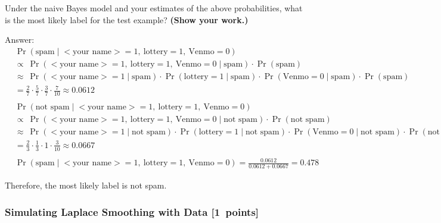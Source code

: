 \documentclass{article}
\newcommand{\blu}[1]{{\textcolor{blu}{#1}}}
\newenvironment{answer}{\par\begingroup\color{gre}Answer: }{\endgroup}
\let\ask\blu
\newcommand\pts[1]{\textcolor{pointscolour}{[#1~points]}}
\begin{document}
    \ask{Under the naive Bayes model and your estimates of the above probabilities, what is the most likely label for the test example? \textbf{(Show your work.)}}
    \begin{answer}
        \begin{align*}
            &\Pr(\text{spam} \mid \text{$<$your name$>$} = 1,\: \text{lottery} = 1,\: \text{Venmo} = 0)\\
            &\propto\: \Pr(\text{$<$your name$>$} = 1,\: \text{lottery} = 1,\: \text{Venmo} = 0\mid \text{spam}) \cdot \Pr(\text{spam})\\
            &\approx\: \Pr(\text{$<$your name$>$} = 1 \mid \text{spam}) \cdot \Pr(\text{lottery} = 1 \mid \text{spam}) \cdot \Pr(\text{Venmo} = 0\mid \text{spam}) \cdot \Pr(\text{spam})\\
            &= \frac{2}{7} \cdot \frac{5}{7} \cdot \frac{3}{7} \cdot \frac{7}{10} \approx 0.0612
            \\\\
            &\Pr(\text{not spam} \mid \text{$<$your name$>$} = 1,\: \text{lottery} = 1,\: \text{Venmo} = 0)\\
            &\propto\: \Pr(\text{$<$your name$>$} = 1,\: \text{lottery} = 1,\: \text{Venmo} = 0\mid \text{not spam}) \cdot \Pr(\text{not spam})\\
            &\approx\: \Pr(\text{$<$your name$>$} = 1 \mid \text{not spam}) \cdot \Pr(\text{lottery} = 1 \mid \text{not spam}) \cdot \Pr(\text{Venmo} = 0\mid \text{not spam}) \cdot \Pr(\text{not spam})\\
            &= \frac{2}{3} \cdot \frac{1}{3} \cdot 1 \cdot \frac{3}{10} \approx 0.0667
            \\\\
            &\Pr(\text{spam} \mid \text{$<$your name$>$} = 1,\: \text{lottery} = 1,\: \text{Venmo} = 0) = \frac{0.0612}{0.0612 + 0.0667} = 0.478
        \end{align*}

        Therefore, the most likely label is not spam.
    \end{answer}

    \subsubsection{Simulating Laplace Smoothing with Data \pts{1}}
    \label{laplace.conceptual}
\end{document}
